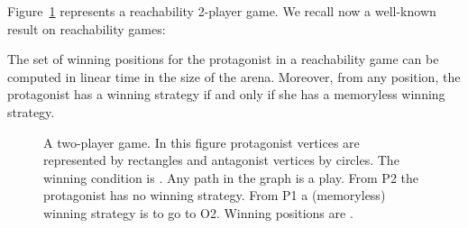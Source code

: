 \documentclass[envcountsame]{llncs} \usepackage[english]{babel}
\begin{document}
Figure~\ref{fig:synth} represents a reachability 2-player game. We recall now a well-known result on reachability games:


\begin{theorem} \label{th:memoryless}The set of winning positions for the protagonist in a reachability
game can be computed in linear time in the size of the arena. Moreover, from any position, the protagonist
has a winning strategy if and only if she has a memoryless winning strategy.
\end{theorem}

\begin{figure}[t]
\centering 
{} \caption{A two-player game. In this figure protagonist vertices are
represented by rectangles and antagonist vertices by circles. 
The winning condition is . Any path in the graph is a play.
From P2 the protagonist has no winning strategy. From P1 a (memoryless) winning strategy is to go to O2.
Winning positions are .} 
\label{fig:synth}
\end{figure}

 
\end{document}
